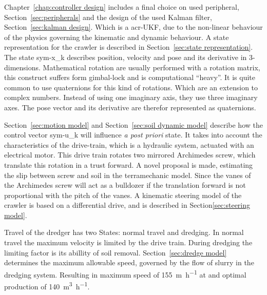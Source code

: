 Chapter~\ref{chap:controller design} includes a final choice on used peripheral, Section~\ref{sec:peripherals} and
the design of the used Kalman filter, Section~\ref{sec:kalman design}. Which is a \gls{acr-UKF}, due to the
non-linear behaviour of the physics governing the kinematic and dynamic behaviour. A state representation for the
crawler is described in Section~\ref{sec:state representation}. The state \gls{sym-x_k} describes position,
velocity and pose and its derivative in 3-dimensions. Mathematical rotation are usually performed with a rotation
matrix, this construct suffers form gimbal-lock and is computational ``heavy''. It is quite common to use quaternions
for this kind of rotations. Which are an extension to complex numbers. Instead of using one imaginary axis, they use
three imaginary axes. The pose vector and its derivative are therefor represented as quaternions.

Section~\ref{sec:motion model} and Section~\ref{sec:soil dynamic model} describe how the control vector \gls{sym-u_k}
will influence \textit{a post priori} state. It takes into account the characteristics of the drive-train, which is a
hydraulic system, actuated with an electrical motor. This drive train rotates two mirrored Archimedes screw, which
translate this rotation in a trust forward. A novel proposal is made, estimating the slip between screw and soil in
the terramechanic model. Since the vanes of the Archimedes screw will act as a bulldozer if the translation forward
is not proportional with the pitch of the vanes. A kinematic steering model of the crawler is based on a differential
drive, and is described in Section\ref{sec:steering model}.

Travel of the dredger has two States: normal travel and dredging. In normal travel the maximum velocity is limited by
the drive train. During dredging the limiting factor is its abillity of soil removal. Section~\ref{sec:dredge model}
determines the maximum allowable speed, governed by the flow of slurry in the dredging system. Resulting in maximum
speed of \SI{155}{\metre\per\hour} at and optimal production of \SI{140}{\cubic\metre\per\hour}.

